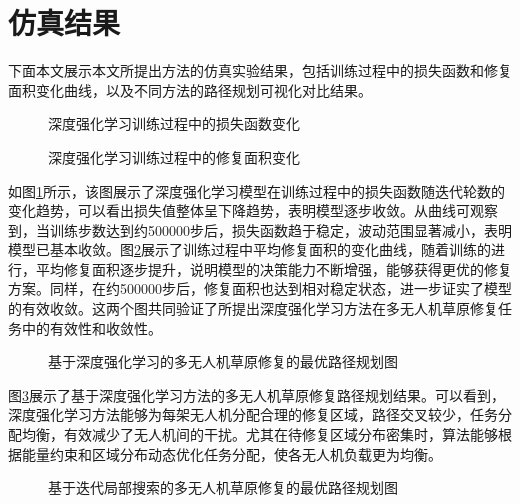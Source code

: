 \documentclass[AutoFakeBold]{LZUThesis}
\begin{document}
\section{仿真结果}


下面本文展示本文所提出方法的仿真实验结果，包括训练过程中的损失函数和修复面积变化曲线，以及不同方法的路径规划可视化对比结果。

\begin{figure}[H]
	\centering
	
	\caption{深度强化学习训练过程中的损失函数变化}
	\label{fig:training_loss_curve}
\end{figure}

\begin{figure}[H]
	\centering
	
	\caption{深度强化学习训练过程中的修复面积变化}
	\label{fig:training_reward_curve}
\end{figure}

如图\ref{fig:training_loss_curve}所示，该图展示了深度强化学习模型在训练过程中的损失函数随迭代轮数的变化趋势，可以看出损失值整体呈下降趋势，表明模型逐步收敛。从曲线可观察到，当训练步数达到约500000步后，损失函数趋于稳定，波动范围显著减小，表明模型已基本收敛。图\ref{fig:training_reward_curve}展示了训练过程中平均修复面积的变化曲线，随着训练的进行，平均修复面积逐步提升，说明模型的决策能力不断增强，能够获得更优的修复方案。同样，在约500000步后，修复面积也达到相对稳定状态，进一步证实了模型的有效收敛。这两个图共同验证了所提出深度强化学习方法在多无人机草原修复任务中的有效性和收敛性。
\begin{figure}[H]
	\centering
	
	\caption{基于深度强化学习的多无人机草原修复的最优路径规划图}
	\label{fig:RL_combined_uav_routes}
\end{figure}

图\ref{fig:RL_combined_uav_routes}展示了基于深度强化学习方法的多无人机草原修复路径规划结果。可以看到，深度强化学习方法能够为每架无人机分配合理的修复区域，路径交叉较少，任务分配均衡，有效减少了无人机间的干扰。尤其在待修复区域分布密集时，算法能够根据能量约束和区域分布动态优化任务分配，使各无人机负载更为均衡。

\begin{figure}[H]
	\centering
	
	\caption{基于迭代局部搜索的多无人机草原修复的最优路径规划图}
	\label{fig:ILS_combined_uav_routes}
\end{figure}
\end{document}
